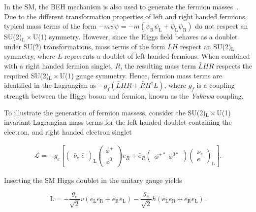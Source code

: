 In the SM, the BEH mechanism is also used to generate the fermion masses~\cite{Thomson}. Due to the different transformation properties of left and right handed fermions, typical mass terms of the form $-m\bar{\psi}\psi = -m(\bar{\psi}_{\mathrm{R}}\psi_{\mathrm{L}} + \bar{\psi}_{\mathrm{L}}\psi_{\mathrm{R}})$ do not respect an SU(2)$_{\mathrm{L}}\times$U(1) symmetry. However, since the Higgs field behaves as a doublet under SU(2) transformations, mass terms of the form $\bar{L}H$ respect an SU(2)$_{\mathrm{L}}$ symmetry, where $L$ represents a doublet of left handed fermions. When combined with a right handed fermion singlet, $R$, the resulting mass term $\bar{L}HR$ respects the required SU(2)$_{\mathrm{L}}\times$U(1) gauge symmetry. Hence, fermion mass terms are identified in the Lagrangian as $-g_{f}(\bar{L}HR + \bar{R}H^{\dagger}L)$, where $g_{f}$ is a coupling strength between the Higgs boson and fermion, known as the \textit{Yukawa} coupling.

To illustrate the generation of fermion massess, consider the SU(2)$_{\mathrm{L}}\times$U(1) invariant Lagrangian mass terms for the left handed doublet containing the electron, and right handed electron singlet

\begin{equation}
\label{eqn:higgs_electron_mass}
\begin{split}
    \mathcal{L} = -g_{e}
    \left[ 
    \begin{pmatrix}
    \bar{\nu}_{e} \; \bar{e}
    \end{pmatrix}    
    _{\mathrm{L}}
    \begin{pmatrix}
    \phi^{+} \\
    \phi^{0}
    \end{pmatrix} 
    e_{R} + \bar{e}_{R}
    \begin{pmatrix}
    \phi^{+*} \; \phi^{0*}
    \end{pmatrix}   
    \begin{pmatrix}
    \nu_{e} \\
    e
    \end{pmatrix} 
    _{\mathrm{L}}
    \right].
\end{split}    
\end{equation}

\noindent Inserting the SM Higgs doublet in the unitary gauge yields

\begin{equation}
    \mathrm{L} = -\frac{g_{e}}{\sqrt{2}}v(\bar{e}_{\mathrm{L}}e_{\mathrm{R}} + \bar{e}_{\mathrm{R}}e_{\mathrm{L}})   -\frac{g_{e}}{\sqrt{2}}h(\bar{e}_{\mathrm{L}}e_{\mathrm{R}} + \bar{e}_{\mathrm{R}}e_{\mathrm{L}}).
\end{equation}

